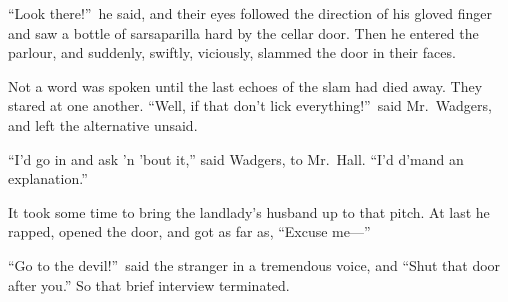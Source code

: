 “Look there!”\ he said, and their eyes followed the direction of his gloved finger and saw a bottle of sarsaparilla hard by the cellar door. Then he entered the parlour, and suddenly, swiftly, viciously, slammed the door in their faces.

{Not a word was spoken until the last echoes of the slam had died away. They stared at one another. “Well, if that don’t lick everything!”\ said Mr.\ Wadgers, and left the alternative unsaid.}

“I’d go in and ask ’n ’bout it,” said Wadgers, to Mr.\ Hall. “I’d d’mand an explanation.”

It took some time to bring the landlady’s husband up to that pitch. At last he rapped, opened the door, and got as far as, “Excuse me—”

“Go to the devil!”\ said the stranger in a tremendous voice, and “Shut that door after you.” So that brief interview terminated.
